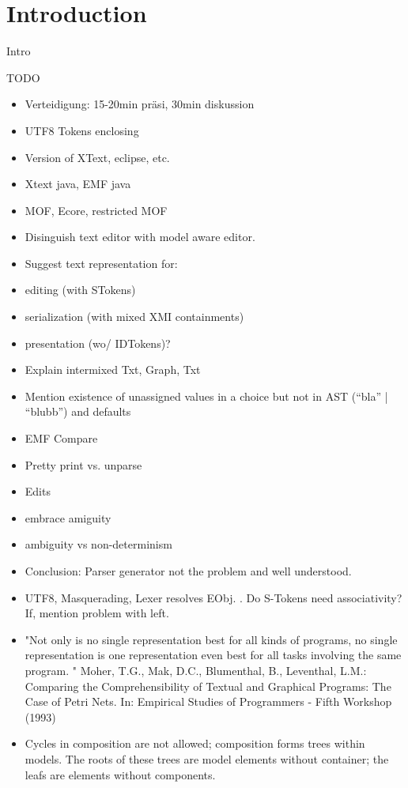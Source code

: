 \chapter{Introduction}
\label{cha:introduction}
Intro

TODO
\begin{itemize}
	\item Verteidigung: 15-20min präsi, 30min diskussion
	\item UTF8 Tokens enclosing
	\item Version of XText, eclipse, etc.
	\item Xtext java, EMF java
	\item MOF, Ecore, restricted MOF 
	\item Disinguish text editor with model aware editor.
	\item Suggest text representation for: 
	\item editing (with STokens)
	\item serialization (with mixed XMI containments)
	\item presentation (wo/ IDTokens)?
	\item Explain intermixed Txt, Graph, Txt
	\item Mention existence of unassigned values in a choice but not in AST (“bla” | “blubb”) and defaults
	\item EMF Compare
	\item Pretty print vs. unparse
	\item Edits
	\item embrace amiguity
	\item ambiguity vs non-determinism
	\item Conclusion: Parser generator not the problem and well understood.
	\item UTF8, Masquerading, Lexer resolves EObj. . Do S-Tokens need associativity? If, mention problem with left.
	\item "Not only is no single representation best for all kinds of programs, no single representation is one representation even best for all tasks involving the same  program. " Moher, T.G., Mak, D.C., Blumenthal, B., Leventhal, L.M.: Comparing the Comprehensibility of Textual and Graphical Programs: The Case of Petri Nets. In: Empirical Studies of Programmers - Fifth Workshop (1993)
	\item Cycles in composition are not allowed; composition forms trees within models. The roots of these trees are
model elements without container; the leafs are elements without components.


\end{itemize}
